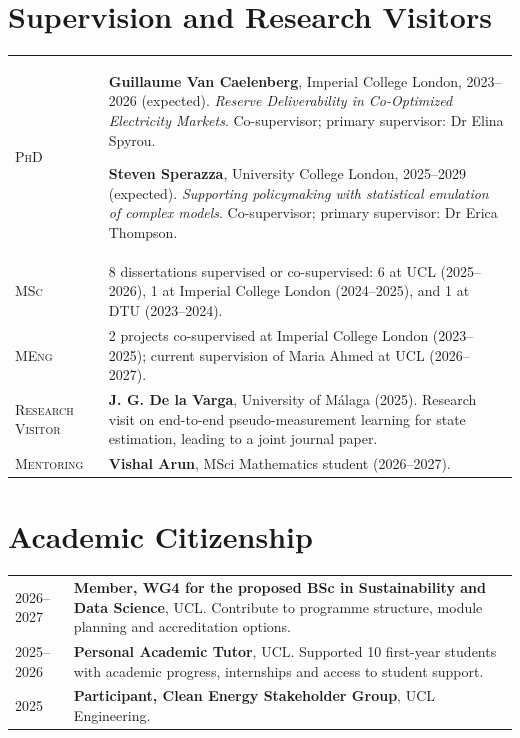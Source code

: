 \documentclass[11pt,a4paper]{article}
\makeatletter
\newlength{\datecolwidth}
\newenvironment{entrylist}{%
  \begin{longtable}{@{}p{\datecolwidth}@{\hspace{0.8em}}p{\dimexpr\linewidth-\datecolwidth-0.8em\relax}@{}}%
}{\end{longtable}}
\newcommand{\labelstyle}[1]{\textsc{#1}}   %
\newcommand{\entrylabel}[2]{%
  \labelstyle{#1} & #2\\[0.8em]
}
\makeatother
\begin{document}
\section*{Supervision and Research Visitors}
\begin{entrylist}
  \entrylabel{PhD}{%
    \textbf{Guillaume Van Caelenberg}, Imperial College London, 2023--2026 (expected).
    \emph{Reserve Deliverability in Co-Optimized Electricity Markets}.
    Co-supervisor; primary supervisor: Dr Elina Spyrou.

    \textbf{Steven Sperazza}, University College London, 2025--2029 (expected).
    \emph{Supporting policymaking with statistical emulation of complex models}.
    Co-supervisor; primary supervisor: Dr Erica Thompson.
  }
  \entrylabel{MSc}{8 dissertations supervised or co-supervised: 6 at UCL (2025--2026), 1 at Imperial College London (2024--2025), and 1 at DTU (2023--2024).}
  \entrylabel{MEng}{2 projects co-supervised at Imperial College London (2023--2025); current supervision of Maria Ahmed at UCL (2026--2027).}
  \entrylabel{Research Visitor}{\textbf{J. G. De la Varga}, University of M\'alaga (2025). Research visit on end-to-end pseudo-measurement learning for state estimation, leading to a joint journal paper.}
  \entrylabel{Mentoring}{\textbf{Vishal Arun}, MSci Mathematics student (2026--2027).}
\end{entrylist}


\section*{Academic Citizenship}
\begin{entrylist}
  \entrylabel{2026--2027}{\textbf{Member, WG4 for the proposed BSc in Sustainability and Data Science}, UCL. Contribute to programme structure, module planning and accreditation options.}
  \entrylabel{2025--2026}{\textbf{Personal Academic Tutor}, UCL. Supported 10 first-year students with academic progress, internships and access to student support.}
  \entrylabel{2025}{\textbf{Participant, Clean Energy Stakeholder Group}, UCL Engineering.}
\end{entrylist}

\end{document}
